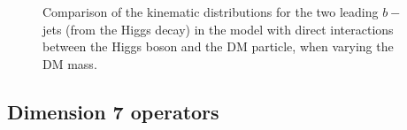\begin{figure}[hbpt!]
 	\caption{Comparison of the kinematic distributions for the two leading $b-$ jets (from the Higgs decay) in the model with direct interactions
 		between the Higgs boson and the DM particle, when varying the DM mass. 
 		\label{fig:Hbb_Dim5}}
 \end{figure}
 
 

\subsection{Dimension 7 operators}
\label{sub:EW_EFT_Dim7}


